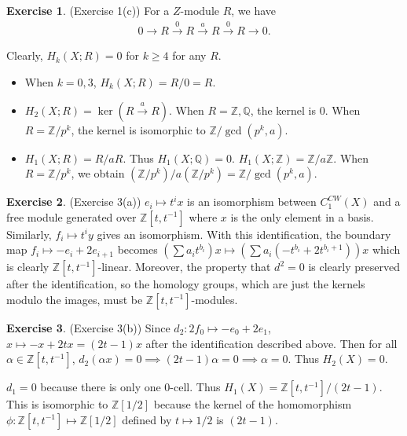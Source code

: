 \documentclass[12pt, psamsfonts]{amsart}
\theoremstyle{definition}
\newtheorem*{exer}{Exercise}
\theoremstyle{remark}
\numberwithin{equation}{section}
\begin{document}
\begin{exer}{(Exercise 1(c))}
  For a $Z$-module $R$, we have
  \begin{align*}
    0 \rightarrow R \xrightarrow{0} R \xrightarrow{a} R \xrightarrow{0} R \rightarrow 0.
  \end{align*}

  Clearly, $H_k(X; R) = 0$ for $k \geq 4$ for any $R$.
  \begin{itemize}
    \item
      When $k = 0, 3$, $H_k(X; R) = R / 0 = R$.
    \item
      $H_2(X; R) = \ker(R \xrightarrow{a} R)$.
      When $R = \mathbb{Z}, \mathbb{Q}$, the kernel is 0.
      When $R = \mathbb{Z} / p^k$, the kernel is isomorphic to $\mathbb{Z} / \gcd(p^k, a)$.
    \item
      $H_1(X; R) = R / aR$.
      Thus $H_1(X; \mathbb{Q}) = 0$.
      $H_1(X; \mathbb{Z}) = \mathbb{Z} / a\mathbb{Z}$.
      When $R = \mathbb{Z} / p^k$, we obtain $(\mathbb{Z} / p^k) / a(\mathbb{Z} / p^k) = \mathbb{Z} / \gcd(p^k, a)$.
  \end{itemize}
\end{exer}

\begin{exer}{(Exercise 3(a))}
  $e_i \mapsto t^ix$ is an isomorphism between $C_1^{CW}(X)$ and a free module generated over $\mathbb{Z}[t, t^{-1}]$ where $x$ is the only element in a basis.
  Similarly, $f_i \mapsto t^iy$ gives an isomorphism.
  With this identification, the boundary map $f_i \mapsto -e_i + 2e_{i + 1}$ becomes $(\sum a_it^{b_i}) x \mapsto (\sum a_i(-t^{b_i} + 2t^{b_i + 1}))x$ which is clearly $\mathbb{Z}[t, t^{-1}]$-linear.
  Moreover, the property that $d^2 = 0$ is clearly preserved after the identification, so the homology groups, which are just the kernels modulo the images, must be $\mathbb{Z}[t, t^{-1}]$-modules.
\end{exer}

\begin{exer}{(Exercise 3(b))}
  Since $d_2: 2f_0 \mapsto -e_0 + 2e_1$, $x \mapsto -x + 2tx = (2t - 1)x$ after the identification described above.
  Then for all $\alpha \in \mathbb{Z}[t, t^{-1}]$, $d_2(\alpha x) = 0 \implies (2t - 1)\alpha = 0 \implies \alpha = 0$.
  Thus $H_2(X) = 0$.

  $d_1 = 0$ because there is only one 0-cell.
  Thus $H_1(X) = \mathbb{Z}[t, t^{-1}] / (2t - 1)$.
  This is isomorphic to $\mathbb{Z}[1/2]$ because the kernel of the homomorphism $\phi: \mathbb{Z}[t, t^{-1}] \mapsto \mathbb{Z}[1/2]$ defined by $t \mapsto 1/2$ is $(2t - 1)$.
\end{exer}
\end{document}
